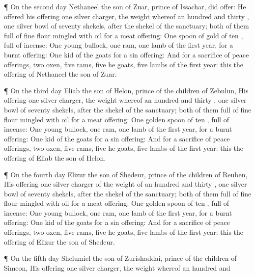 {\par }{\PP {}¶ On the
second
day
Nethaneel the
son of
Zuar,
prince of
Issachar, did
offer:
He
offered
{} his
offering
one
silver
charger, the
weight whereof
{} an
hundred and
thirty
{},
one
silver
bowl of
seventy
shekels, after the
shekel of the
sanctuary;
both of them
full of fine
flour
mingled with
oil for a meat
offering:
One
spoon of
gold of
ten
{},
full of
incense:
One
young
bullock,
one
ram,
one
lamb of the
first
year, for a burnt
offering:
One
kid of the
goats for a sin
offering:
And for a
sacrifice of peace
offerings,
two
oxen,
five
rams,
five he
goats,
five
lambs of the
first
year: this
{} the
offering of
Nethaneel the
son of
Zuar.
\par }{\PP {}¶ On the
third
day
Eliab the
son of
Helon,
prince of the
children of
Zebulun,
{}
His
offering
{}
one
silver
charger, the
weight whereof
{} an
hundred and
thirty
{},
one
silver
bowl of
seventy
shekels, after the
shekel of the
sanctuary;
both of them
full of fine
flour
mingled with
oil for a meat
offering:
One
golden
spoon of
ten
{},
full of
incense:
One
young
bullock,
one
ram,
one
lamb of the
first
year, for a burnt
offering:
One
kid of the
goats for a sin
offering:
And for a
sacrifice of peace
offerings,
two
oxen,
five
rams,
five he
goats,
five
lambs of the
first
year: this
{} the
offering of
Eliab the
son of
Helon.
\par }{\PP {}¶ On the
fourth
day
Elizur the
son of
Shedeur,
prince of the
children of
Reuben,
{}
His
offering
{}
one
silver
charger of the
weight of an
hundred and
thirty
{},
one
silver
bowl of
seventy
shekels, after the
shekel of the
sanctuary;
both of them
full of fine
flour
mingled with
oil for a meat
offering:
One
golden
spoon of
ten
{},
full of
incense:
One
young
bullock,
one
ram,
one
lamb of the
first
year, for a burnt
offering:
One
kid of the
goats for a sin
offering:
And for a
sacrifice of peace
offerings,
two
oxen,
five
rams,
five he
goats,
five
lambs of the
first
year: this
{} the
offering of
Elizur the
son of
Shedeur.
\par }{\PP {}¶ On the
fifth
day
Shelumiel the
son of
Zurishaddai,
prince of the
children of
Simeon,
{}
His
offering
{}
one
silver
charger, the
weight whereof
{} an
hundred and
}

